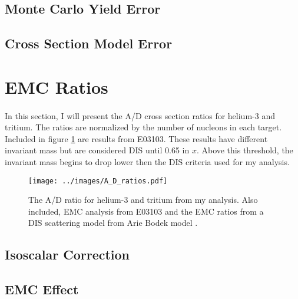 \subsection{Monte Carlo Yield Error}
\cite{Ar_Ti}
\subsection{Cross Section Model Error}


\section{EMC Ratios}
\paragraph{}In this section, I will present the A/D cross section ratios for helium-3 and tritium. The ratios are normalized by the number of nucleons in each target. Included in figure \ref{ADplot} are results from E03103. These results have different invariant mass but are considered DIS until 0.65 in $x$. Above this threshold, the invariant mass begins to drop lower then the DIS criteria used for my analysis. 

\begin{figure}
	\hspace{-60pt}
	\texttt{[image: ../images/A\_D\_ratios.pdf]}
	\caption{The A/D ratio for helium-3 and tritium from my analysis. Also included, EMC analysis from E03103\cite{seeley} and the EMC ratios from a DIS scattering model from Arie Bodek model \cite{DISmodel}.}
	\label{ADplot}
\end{figure}




\subsection{Isoscalar Correction}
\subsection{EMC Effect}

